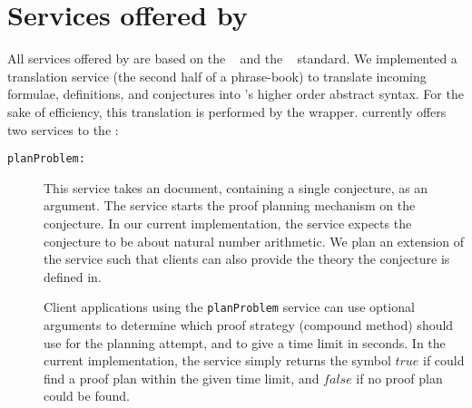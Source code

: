 \section{Services offered by {\lclam}}
All services offered by {\lclam} are based on the
{\openmath}~\cite{CapCoh:doms98} and the
{\omdoc}~\cite{Kohlhase:otormd00} standard. We implemented a
translation service (the second half of a phrase-book) to translate
incoming formulae, definitions, and conjectures into {\lclam}'s higher
order abstract syntax. For the sake of efficiency, this translation is
performed by the {\mathwebsb} wrapper.  {\lclam} currently offers two
services to the {\mathwebsb}:
\begin{description}

  
\item[{\tt planProblem:}] This service takes an {\omdoc} document,
  containing a single conjecture, as an argument. The service starts
  the {\lclam} proof planning mechanism on the conjecture. In our
  current implementation, the service expects the conjecture to be
  about natural number arithmetic. We plan an extension of the service
  such that clients can also provide the theory the conjecture is
  defined in.
  
  Client applications using the {\tt planProblem} service can use
  optional arguments to determine which proof strategy (compound
  method) {\lclam} should use for the planning attempt, and to give a
  time limit in seconds.  In the current implementation, the service
  simply returns the {\openmath} symbol $true$ if {\lclam} could find
  a proof plan within the given time limit, and $false$ if no proof
  plan could be found.
  

\end{description}
